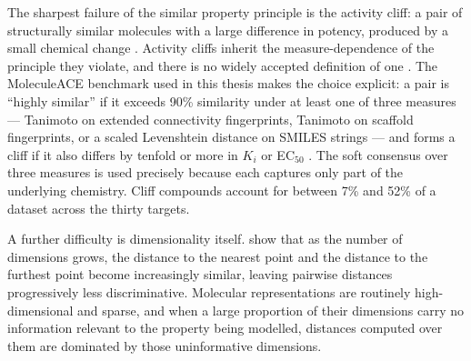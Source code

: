The sharpest failure of the similar property principle is the activity cliff: a pair of structurally similar molecules with a large difference in potency, produced by a small
chemical change \citep{Maggiora2006, Stumpfe2012}. Activity cliffs inherit the measure-dependence of the principle they violate, and there is no widely accepted definition of one
\citep{vanTilborg2022}. The MoleculeACE benchmark used in this thesis makes the choice explicit: a pair is ``highly similar'' if it exceeds 90\% similarity under at least one of
three measures --- Tanimoto on extended connectivity fingerprints, Tanimoto on scaffold fingerprints, or a scaled Levenshtein distance on SMILES strings --- and forms a cliff if
it also differs by tenfold or more in $K_i$ or EC$_{50}$ \citep{vanTilborg2022}. The soft consensus over three measures is used precisely because each captures only part of the
underlying chemistry. Cliff compounds account for between 7\% and 52\% of a dataset across the thirty targets.

A further difficulty is dimensionality itself. \citet{Aggarwal2001} show that as the number of dimensions grows, the distance to the nearest point and the distance to the furthest
point become increasingly similar, leaving pairwise distances progressively less discriminative. Molecular representations are routinely high-dimensional and sparse, and when a
large proportion of their dimensions carry no information relevant to the property being modelled, distances computed over them are dominated by those uninformative dimensions.



